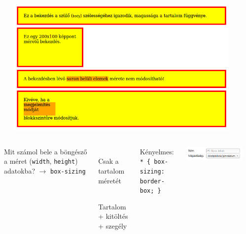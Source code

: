 \begin{frame}
  \begin{columns}[c]
      \begin{exampleblock}{}
        \tiny
        
      \end{exampleblock}
      \includegraphics[width=0.9\textwidth]{dobozMeret.png}
  \end{columns}
  \begin{exampleblock}{\vspace*{-3ex}}
    \tiny
    
  \end{exampleblock}
\end{frame}

\begin{frame}
\begin{columns}[c]
    Mit számol bele a böngésző a méret (\texttt{width}, 
    \texttt{height}) adatokba? $\to$ \texttt{box-sizing}
    \begin{description}[m]
      \item[\texttt{content-box}] \hfill \\ 
        Csak a tartalom méretét
      \item[\texttt{border-box}] \hfill \\ 
        Tartalom + kitöltés + szegély
    \end{description}
    \vfill
    Kényelmes:\\
    \texttt{* \{ box-sizing: border-box; \} }
    \begin{center}
      \includegraphics[scale=0.5]{meretezes.png}
    \end{center}
    \begin{exampleblock}{}
      \scriptsize
      
    \end{exampleblock}
\end{columns} 
  
\end{frame}

